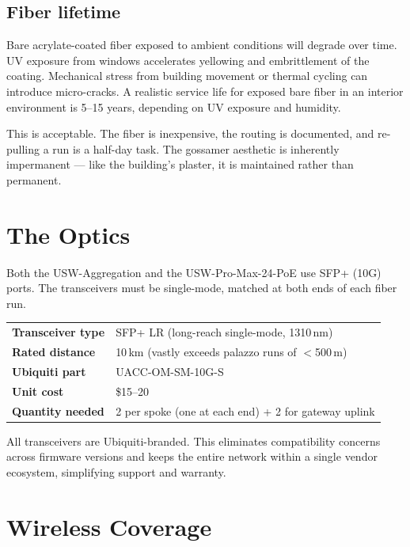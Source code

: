 \documentclass[10pt, letterpaper]{article}
\begin{document}
\subsection{Fiber lifetime}

Bare acrylate-coated fiber exposed to ambient conditions will degrade over time. UV exposure from windows accelerates yellowing and embrittlement of the coating. Mechanical stress from building movement or thermal cycling can introduce micro-cracks. A realistic service life for exposed bare fiber in an interior environment is 5--15 years, depending on UV exposure and humidity.

This is acceptable. The fiber is inexpensive, the routing is documented, and re-pulling a run is a half-day task. The gossamer aesthetic is inherently impermanent --- like the building's plaster, it is maintained rather than permanent.

\section{The Optics}

Both the USW-Aggregation and the USW-Pro-Max-24-PoE use SFP+ (10G) ports. The transceivers must be single-mode, matched at both ends of each fiber run.

\begin{metricbox}
\begin{tabularx}{\textwidth}{@{} >{\bfseries}l X @{}}
Transceiver type & SFP+ LR (long-reach single-mode, 1310\,nm) \\
Rated distance & 10\,km (vastly exceeds palazzo runs of $<$500\,m) \\
Ubiquiti part & UACC-OM-SM-10G-S \\
Unit cost & \$15--20 \\
Quantity needed & 2 per spoke (one at each end) + 2 for gateway uplink \\
\end{tabularx}
\end{metricbox}

All transceivers are Ubiquiti-branded. This eliminates compatibility concerns across firmware versions and keeps the entire network within a single vendor ecosystem, simplifying support and warranty.

\section{Wireless Coverage}
\end{document}
